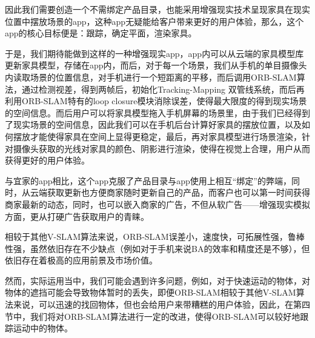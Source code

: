 因此我们需要创造一个不需绑定产品目录，也能采用增强现实技术呈现家具在现实位置中摆放场景的app，这种app无疑能给客户带来更好的用户体验，那么，这个app的核心目标便是：跟踪，确定平面，渲染家具。

于是，我们期待能做到这样的一种增强现实app，app内可以从云端的家具模型库更新家具模型，存储在app内，而后，对于每一个场景，我们从手机的单目摄像头内读取场景的位置信息，对手机进行一个短距离的平移，而后调用ORB-SLAM算法，通过检测视差，得到两帧后，初始化Tracking-Mapping 双管线系统，而后再利用ORB-SLAM特有的loop closure模块消除误差，使得最大限度的得到现实场景的空间信息。而后用户可以将家具模型拖入手机屏幕的场景里，由于我们已经得到了现实场景的空间信息，因此我们可以在手机后台计算好家具的摆放位置，以及如何摆放才能使得家具在空间上显得更稳定，最后，再对家具模型进行场景渲染，针对摄像头获取的光线对家具的颜色、阴影进行渲染，使得在视觉上合理，用户从而获得更好的用户体验。

与宜家的app相比，这个app克服了产品目录与app使用上相互“绑定”的弊端，同时，从云端获取更新也方便商家随时更新自己的产品，而客户也可以第一时间获得商家最新的动态，同时，也可以嵌入商家的广告，不但从软广告——增强现实模拟方面，更从打硬广告获取用户的青睐。

相较于其他V-SLAM算法来说，ORB-SLAM误差小，速度快，可拓展性强，鲁棒性强，虽然依旧存在不少缺点（例如对于手机来说BA的效率和精度还是不够），但依旧存在着极高的应用前景及市场价值。

然而，实际运用当中，我们可能会遇到许多问题，例如，对于快速运动的物体，对物体的遮挡可能会导致物体暂时的丢失，即便ORB-SLAM相较于其他V-SLAM算法来说，可以迅速的找回物体，但也会给用户来带糟糕的用户体验，因此，在第四节中，我们将对ORB-SLAM算法进行一定的改进，使得ORB-SLAM可以较好地跟踪运动中的物体。